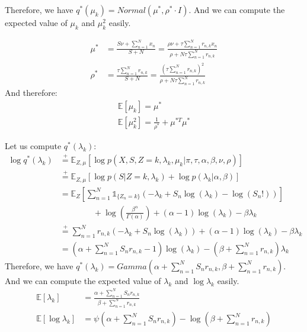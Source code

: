 \documentclass{article}
\begin{document}
Therefore, we have $q^*(\mu_k) = Normal\left(\mu^*, \rho^* \cdot I\right)$. And we can compute the expected value of $\mu_k$ and $\mu_k^2$ easily.

\begin{equation}
  \begin{split}
    \mu^*  & = \frac{S\nu + \sum_{n=1}^{N}x_n}{S+N}   = \frac{\rho\nu + \tau\sum_{n=1}^{N}r_{n,k}x_n}{\rho + N\tau\sum_{n=1}^{N}r_{n,k}} \\
    \rho^* & = \frac{\tau\sum_{n=1}^{N}r_{n,k}}{S+N} = \frac{(\tau\sum_{n=1}^{N}r_{n,k})^2}{\rho + N\tau\sum_{n=1}^{N}r_{n,k}}
  \end{split}
\end{equation}
And therefore:
\begin{equation}
  \begin{split}
    \mathbb{E}[\mu_k] = \mu^* \\
    \mathbb{E}[\mu_k^2] = \frac{1}{\rho^*} + \mu^{*T}\mu^*
  \end{split}
\end{equation}

\noindent Let us compute $q^*(\lambda_k)$:
\begin{equation}
  \begin{split}
    \log q^*(\lambda_k) & \overset{+}{=} \mathbb{E}_{Z,\mu}[\log p(X,S,Z = k,\lambda_k,\mu_k|\pi,\tau,\alpha,\beta,\nu,\rho)]                             \\
                        & \overset{+}{=} \mathbb{E}_{Z,\mu}[\log p(S|Z = k,\lambda_k) + \log p(\lambda_k|\alpha,\beta)]                                   \\
                        & = \mathbb{E}_{Z}\left[\sum_{n=1}^{N}\mathbb{1}_{\{Z_n = k\}}\left(-\lambda_k + S_n\log(\lambda_k) - \log(S_n!)\right)\right]    \\
                        & \qquad\qquad + \log \left(\frac{\beta^\alpha}{\Gamma(\alpha)}\right) + (\alpha - 1)\log(\lambda_k) - \beta\lambda_k             \\
                        & \overset{+}{=} \sum_{n=1}^{N}r_{n,k}\left(-\lambda_k + S_n\log(\lambda_k)\right) + (\alpha - 1)\log(\lambda_k) - \beta\lambda_k \\
                        & = \left(\alpha + \sum_{n=1}^{N}S_n r_{n,k} - 1\right)\log(\lambda_k) - \left(\beta + \sum_{n=1}^{N}r_{n,k}\right)\lambda_k
  \end{split}
\end{equation}
Therefore, we have $q^*(\lambda_k) = Gamma\left(\alpha + \sum_{n=1}^{N}S_n r_{n,k}, \beta + \sum_{n=1}^{N}r_{n,k}\right)$. And we can compute the expected value of $\lambda_k$ and $\log \lambda_k$ easily.
\begin{equation}
  \begin{split}
    \mathbb{E}[\lambda_k]      & = \frac{\alpha + \sum_{n=1}^{N}S_n r_{n,k}}{\beta + \sum_{n=1}^{N}r_{n,k}}       \\
    \mathbb{E}[\log \lambda_k] & = \psi(\alpha + \sum_{n=1}^{N}S_n r_{n,k}) - \log(\beta + \sum_{n=1}^{N}r_{n,k})
  \end{split}
\end{equation}
\end{document}

